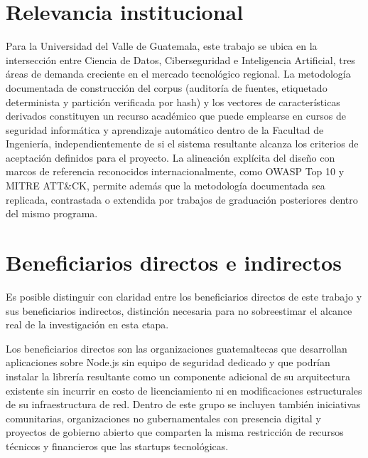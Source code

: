 \section{Relevancia institucional}
Para la Universidad del Valle de Guatemala, este trabajo se ubica en la intersección entre Ciencia
de Datos, Ciberseguridad e Inteligencia Artificial, tres áreas de demanda creciente en el mercado
tecnológico regional. La metodología documentada de construcción del corpus (auditoría de fuentes, etiquetado
determinista y partición verificada por hash) y los vectores de características derivados
constituyen un recurso académico que puede emplearse en cursos de seguridad informática y
aprendizaje automático dentro de la Facultad de Ingeniería,
independientemente de si el sistema resultante alcanza los criterios de aceptación definidos para
el proyecto. La alineación explícita del diseño con marcos de referencia reconocidos
internacionalmente, como OWASP Top 10 y MITRE ATT\&CK, permite además que la metodología
documentada sea replicada, contrastada o extendida por trabajos de graduación posteriores dentro
del mismo programa.

\section{Beneficiarios directos e indirectos}
Es posible distinguir con claridad entre los beneficiarios directos de este trabajo y sus beneficiarios
indirectos, distinción necesaria para no sobreestimar el alcance real de la investigación en esta
etapa.

Los beneficiarios directos son las organizaciones guatemaltecas que desarrollan aplicaciones
sobre Node.js sin equipo de seguridad dedicado y que podrían instalar la librería resultante como
un componente adicional de su arquitectura existente sin incurrir en costo de licenciamiento ni en
modificaciones estructurales de su infraestructura de red. Dentro de este grupo se incluyen
también iniciativas comunitarias, organizaciones no gubernamentales con presencia digital y
proyectos de gobierno abierto que comparten la misma restricción de recursos técnicos y
financieros que las startups tecnológicas.

